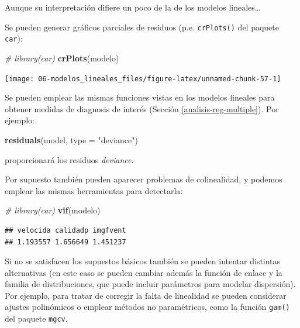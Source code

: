 \documentclass[
  spanish,
]{book}
\newenvironment{Shaded}{\begin{snugshade}}{\end{snugshade}}
\newcommand{\CommentTok}[1]{\textcolor[rgb]{0.56,0.35,0.01}{\textit{#1}}}
\newcommand{\DataTypeTok}[1]{\textcolor[rgb]{0.13,0.29,0.53}{#1}}
\newcommand{\KeywordTok}[1]{\textcolor[rgb]{0.13,0.29,0.53}{\textbf{#1}}}
\newcommand{\NormalTok}[1]{#1}
\newcommand{\StringTok}[1]{\textcolor[rgb]{0.31,0.60,0.02}{#1}}
\theoremstyle{break}
\theoremstyle{definition}
\theoremstyle{definition}
\theoremstyle{definition}
\theoremstyle{remark}
\begin{document}
Aunque su interpretación difiere un poco de la de los modelos lineales\ldots{}

Se pueden generar gráficos parciales de residuos (p.e. \texttt{crPlots()} del paquete \texttt{car}):

\begin{Shaded}
\begin{Highlighting}[]
\CommentTok{# library(car)}
\KeywordTok{crPlots}\NormalTok{(modelo)}
\end{Highlighting}
\end{Shaded}

\begin{center}\texttt{[image: 06-modelos\_lineales\_files/figure-latex/unnamed-chunk-57-1]} \end{center}

Se pueden emplear las mismas funciones vistas en los modelos lineales para obtener medidas de diagnosis de interés (Sección \ref{analisis-reg-multiple}). Por ejemplo:

\begin{Shaded}
\begin{Highlighting}[]
\KeywordTok{residuals}\NormalTok{(model, }\DataTypeTok{type =} \StringTok{"deviance"}\NormalTok{)}
\end{Highlighting}
\end{Shaded}

proporcionará los residuos \emph{deviance}.

Por supuesto también pueden aparecer problemas de colinealidad, y podemos emplear las mismas herramientas para detectarla:

\begin{Shaded}
\begin{Highlighting}[]
\CommentTok{# library(car)}
\KeywordTok{vif}\NormalTok{(modelo)}
\end{Highlighting}
\end{Shaded}

\begin{verbatim}
## velocida calidadp imgfvent 
## 1.193557 1.656649 1.451237
\end{verbatim}

Si no se satisfacen los supuestos básicos también se pueden intentar distintas alternativas (en este caso se pueden cambiar además la función de enlace y la familia de distribuciones, que puede incluir parámetros para modelar dispersión).
Por ejemplo, para tratar de corregir la falta de linealidad se pueden considerar ajustes polinómicos o emplear métodos no paramétricos, como la función \texttt{gam()} del paquete \texttt{mgcv}.
\end{document}
